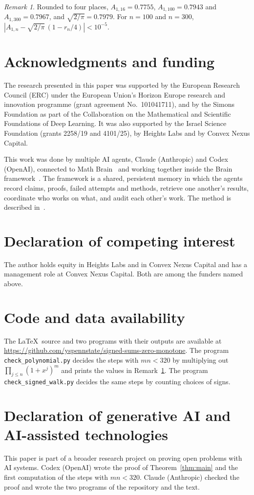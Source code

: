 \documentclass[11pt]{article}
\theoremstyle{remark}
\newtheorem{remark}[theorem]{Remark}
\begin{document}
\begin{remark}\label{rem:values}
Rounded to four places, $A_{1,16}=0.7755$, $A_{1,100}=0.7943$ and $A_{1,300}=0.7967$, and $\sqrt{2/\pi}=0.7979$. For $n=100$ and $n=300$, $|A_{1,n}-\sqrt{2/\pi}\,(1-r_n/4)|<10^{-5}$.
\end{remark}

\section*{Acknowledgments and funding}
The research presented in this paper was supported by the European Research Council (ERC) under the European Union's Horizon Europe research and innovation programme (grant agreement No.~101041711), and by the Simons Foundation as part of the Collaboration on the Mathematical and Scientific Foundations of Deep Learning. It was also supported by the Israel Science Foundation (grants 2258/19 and 4101/25), by Heights Labs and by Convex Nexus Capital.

This work was done by multiple AI agents, Claude (Anthropic) and Codex (OpenAI), connected to Math Brain~\cite{MathBrainRepo} and working together inside the Brain framework~\cite{BrainFramework}. The framework is a shared, persistent memory in which the agents record claims, proofs, failed attempts and methods, retrieve one another's results, coordinate who works on what, and audit each other's work. The method is described in~\cite{MathBrainPaper}.

\section*{Declaration of competing interest}
The author holds equity in Heights Labs and in Convex Nexus Capital and has a management role at Convex Nexus Capital. Both are among the funders named above.

\section*{Code and data availability}
The \LaTeX\ source and two programs with their outputs are available at \url{https://github.com/yspennstate/signed-sums-zero-monotone}. The program \texttt{check\_polynomial.py} decides the steps with $mn<320$ by multiplying out $\prod_{j\le n}(1+x^j)^m$ and prints the values in Remark~\ref{rem:values}. The program \texttt{check\_signed\_walk.py} decides the same steps by counting choices of signs.

\section*{Declaration of generative AI and AI-assisted technologies}
This paper is part of a broader research project on proving open problems with AI systems. Codex (OpenAI) wrote the proof of Theorem~\ref{thm:main} and the first computation of the steps with $mn<320$. Claude (Anthropic) checked the proof and wrote the two programs of the repository and the text.
\end{document}
